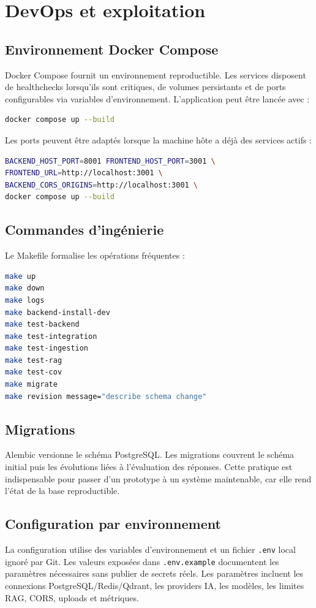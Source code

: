 \documentclass[12pt,a4paper,oneside]{report}
\begin{document}
\chapter{DevOps et exploitation}

\section{Environnement Docker Compose}
Docker Compose fournit un environnement reproductible. Les services disposent de healthchecks lorsqu'ils sont critiques, de volumes persistants et de ports configurables via variables d'environnement. L'application peut être lancée avec :

\begin{lstlisting}[language=bash]
docker compose up --build
\end{lstlisting}

Les ports peuvent être adaptés lorsque la machine hôte a déjà des services actifs :

\begin{lstlisting}[language=bash]
BACKEND_HOST_PORT=8001 FRONTEND_HOST_PORT=3001 \
FRONTEND_URL=http://localhost:3001 \
BACKEND_CORS_ORIGINS=http://localhost:3001 \
docker compose up --build
\end{lstlisting}

\section{Commandes d'ingénierie}
Le Makefile formalise les opérations fréquentes :
\begin{lstlisting}[language=bash]
make up
make down
make logs
make backend-install-dev
make test-backend
make test-integration
make test-ingestion
make test-rag
make test-cov
make migrate
make revision message="describe schema change"
\end{lstlisting}

\section{Migrations}
Alembic versionne le schéma PostgreSQL. Les migrations couvrent le schéma initial puis les évolutions liées à l'évaluation des réponses. Cette pratique est indispensable pour passer d'un prototype à un système maintenable, car elle rend l'état de la base reproductible.

\section{Configuration par environnement}
La configuration utilise des variables d'environnement et un fichier \texttt{.env} local ignoré par Git. Les valeurs exposées dans \texttt{.env.example} documentent les paramètres nécessaires sans publier de secrets réels. Les paramètres incluent les connexions PostgreSQL/Redis/Qdrant, les providers IA, les modèles, les limites RAG, CORS, uploads et métriques.
\end{document}
